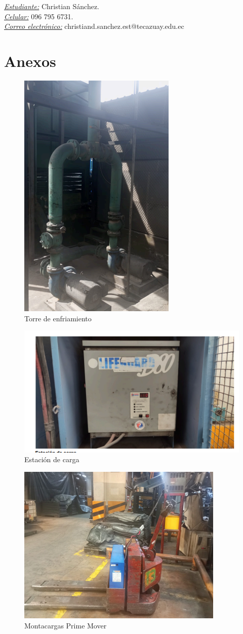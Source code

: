 \documentclass[11pt]{article}
\begin{document}
        \noindent  \textit{\underline{Estudiante:}} Christian Sánchez. \\
        \textit{\underline{Celular:}}  096 795 6731.\\
        \textit{\underline{Correo electrónico:}} christiand.sanchez.est@tecazuay.edu.ec

    \newpage
    \section{Anexos}
    
    \begin{figure}[htbp]
        \centering
        \includegraphics[width=0.3\linewidth]{img/Anexo1.png}
        \caption{Torre de enfriamiento}
    \end{figure}

    \begin{figure}[htbp]
        \centering
        \includegraphics[width=0.5\linewidth]{img/Anexo2.png}
        \caption{Estación de carga}
    \end{figure}

    \begin{figure}[htbp]
        \centering
        \includegraphics[width=0.4\linewidth]{img/Anexo3.png}
        \caption{Montacargas Prime Mover}
    \end{figure}
\end{document}
